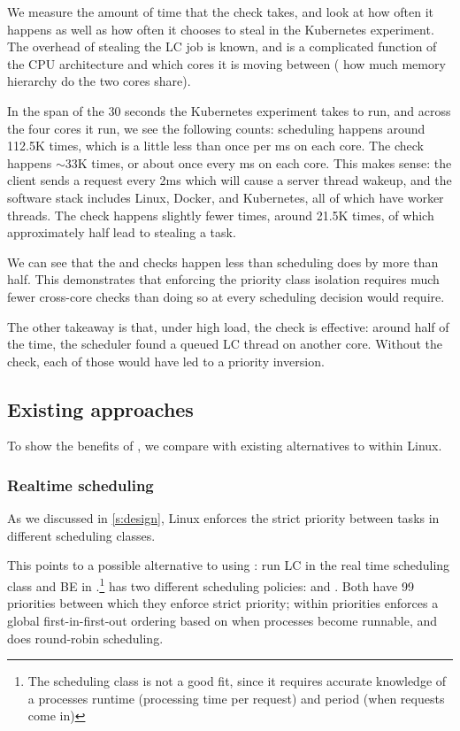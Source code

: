 We measure the amount of time that the \exit{} check takes, and look at how
often it happens as well as how often it chooses to steal in the Kubernetes
experiment. The overhead of stealing the LC job is known, and is a complicated
function of the CPU architecture and which cores it is moving between (\eg{} how
much memory hierarchy do the two cores share).

In the span of the 30 seconds the Kubernetes experiment takes to run, and across
the four cores it run, we see the following counts: scheduling happens around
112.5K times, which is a little less than once per ms on each core. The \entry{}
check happens $\sim$33K times, or about once every ms on each core. This makes
sense: the client sends a request every 2ms which will cause a server thread
wakeup, and the software stack includes Linux, Docker, and Kubernetes, all of
which have worker threads. The \exit{} check happens slightly fewer times,
around 21.5K times, of which approximately half lead to stealing a
\schednormal{} task.

We can see that the \entry{} and \exit{} checks happen less than scheduling does
by more than half. This demonstrates that enforcing the priority class isolation
requires much fewer cross-core checks than doing so at every scheduling decision
would require.

The other takeaway is that, under high load, the \exit{} check is effective:
around half of the time, the scheduler found a queued LC thread on another core.
Without the check, each of those would have led to a priority inversion.


\subsection{Existing approaches}\label{ss:eval:existing}

To show the benefits of \schedbe{}, we compare with existing alternatives to
\cgroups{} within Linux.

\subsubsection{Realtime scheduling}

As we discussed in \autoref{s:design}, Linux enforces the strict priority
between tasks in different scheduling classes. 

This points to a possible alternative to using \cgroups{}: run LC in the real
time \rtclass{} scheduling class and BE in \normalclass{}.\footnote{The
\deadlineclass{} scheduling class is not a good fit, since it requires accurate
knowledge of a processes runtime (processing time per request) and period (when
requests come in)} \rtclass{} has two different scheduling policies:
\schedfifo{} and \schedrr{}. Both have 99 priorities between which they enforce
strict priority; within priorities \schedfifo{} enforces a global
first-in-first-out ordering based on when processes become runnable, and
\schedrr{} does round-robin scheduling.

